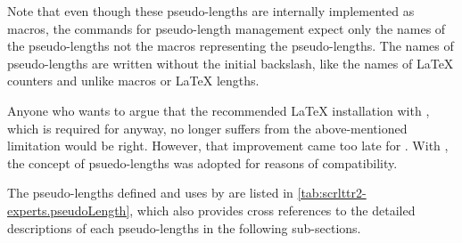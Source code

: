 Note that even though these pseudo-lengths are internally
implemented as macros, the commands for pseudo-length management expect only
the names of the pseudo-lengths not the macros representing the
pseudo-lengths. The names of pseudo-lengths are written without the initial
backslash, like the names of \LaTeX{} counters and unlike macros or \LaTeX{}
lengths.

Anyone who wants to argue that the recommended \LaTeX{} installation with
\eTeX{}, which is required for \KOMAScript{} anyway, no longer suffers from
the above-mentioned limitation would be right. However, that improvement came
too late for . With , the concept of
psuedo-lengths was adopted for reasons of compatibility.

The pseudo-lengths defined and uses by \KOMAScript{} are listed in
\autoref{tab:scrlttr2-experts.pseudoLength}, which also provides cross
references to the detailed descriptions of each pseudo-lengths in the
following sub-sections.

